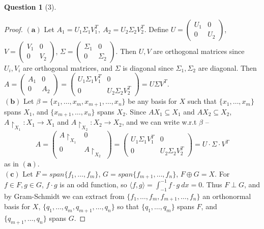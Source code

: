 \documentclass[11pt]{article}
\theoremstyle{quest}
\newtheorem*{question}{Question}
\begin{document}
\begin{question}[3]
\end{question}
\begin{proof}
$\mathbf{(a)}$ Let $A_1 = U_1 \Sigma_1 V_1^T,\ A_2 = U_2 \Sigma_2 V_2^T$. Define $U = \begin{pmatrix}
U_1 & 0 \\
0 & U_2
\end{pmatrix}$, $V = \begin{pmatrix}
V_1 & 0 \\
0 & V_2
\end{pmatrix}$, $\Sigma = \begin{pmatrix}
\Sigma_1 & 0 \\
0 & \Sigma_2
\end{pmatrix}$. Then $U, V$ are orthogonal matrices since $U_i, V_i$ are orthogonal matrices, and $\Sigma$ is diagonal since $\Sigma_1, \Sigma_2$ are diagonal. Then
\\$A = \begin{pmatrix}
A_1 & 0 \\
0 & A_2
\end{pmatrix} = \begin{pmatrix}
U_1 \Sigma_1 V_1^T & 0 \\
0 & U_2 \Sigma_2 V_2^T 
\end{pmatrix} = U \Sigma V^T$.
\\$\mathbf{(b)}$ Let $\beta = \{x_1, \ldots, x_m, x_{m+1}, \ldots, x_n\}$ be any basis for $X$ such that $\{x_1, \ldots, x_m\}$ spans $X_1$, and $\{x_{m+1}, \ldots, x_n\}$ spans $X_2$. Since $AX_1 \subseteq X_1$ and $AX_2 \subseteq X_2$, $A \restriction_{X_1} : X_1 \rightarrow X_1$ and $A \restriction_{X_2} : X_2 \rightarrow X_2$, and we can write w.r.t $\beta$ --
$$A =  \begin{pmatrix}
A \restriction_{X_1} & 0 \\
0 & A \restriction_{X_2}
\end{pmatrix} = \begin{pmatrix}
U_1 \Sigma_1 V_1^T & 0 \\
0 & U_2 \Sigma_2 V_2^T
\end{pmatrix} = U \cdot \Sigma \cdot V^T$$
as in $\mathbf{(a)}$.
\\$\mathbf{(c)}$ Let $F = span \{f_1, \ldots, f_m\}$, $G = span \{f_{m+1}, \ldots, f_n\}$, $F \oplus G = X$. For $f \in F, g \in G$, $f \cdot g$ is an odd function, so $\langle f, g \rangle = \int_{-1}^{-1} f \cdot g\ dx = 0$. Thus $F \perp G$, and by Gram-Schmidt we can extract from $\{f_1, \ldots, f_m, f_{m+1}, \ldots, f_n\}$ an orthonormal basis for $X$, $\{q_1, \ldots, q_m, q_{m+1}, \ldots, q_n\}$ so that $\{q_1, \ldots, q_m\}$ spans $F$, and $\{q_{m+1}, \ldots, q_n\}$ spans $G$. 

\end{proof}
\end{document}
